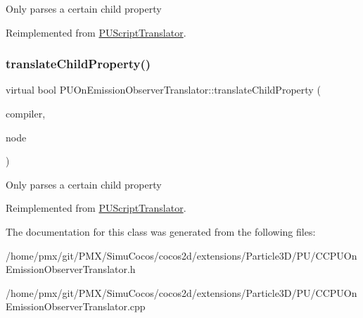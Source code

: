 Only parses a certain child property 

Reimplemented from \hyperlink{classPUScriptTranslator_a0374d83a8a04e57918975d525e0f8fe8}{P\+U\+Script\+Translator}.

\mbox{\label{classPUOnEmissionObserverTranslator_a377b494403c0ba66843166c448e30970}} 
\subsubsection{\texorpdfstring{translate\+Child\+Property()}{translateChildProperty()}\hspace{0.1cm}{\footnotesize\ttfamily [2/2]}}
{\footnotesize\ttfamily virtual bool P\+U\+On\+Emission\+Observer\+Translator\+::translate\+Child\+Property (\begin{DoxyParamCaption}\item[{\hyperlink{classPUScriptCompiler}{P\+U\+Script\+Compiler} $\ast$}]{compiler,  }\item[{\hyperlink{classPUAbstractNode}{P\+U\+Abstract\+Node} $\ast$}]{node }\end{DoxyParamCaption})\hspace{0.3cm}{\ttfamily [virtual]}}

Only parses a certain child property 

Reimplemented from \hyperlink{classPUScriptTranslator_a0374d83a8a04e57918975d525e0f8fe8}{P\+U\+Script\+Translator}.



The documentation for this class was generated from the following files\+:\begin{DoxyCompactItemize}
\item 
/home/pmx/git/\+P\+M\+X/\+Simu\+Cocos/cocos2d/extensions/\+Particle3\+D/\+P\+U/C\+C\+P\+U\+On\+Emission\+Observer\+Translator.\+h\item 
/home/pmx/git/\+P\+M\+X/\+Simu\+Cocos/cocos2d/extensions/\+Particle3\+D/\+P\+U/C\+C\+P\+U\+On\+Emission\+Observer\+Translator.\+cpp\end{DoxyCompactItemize}
